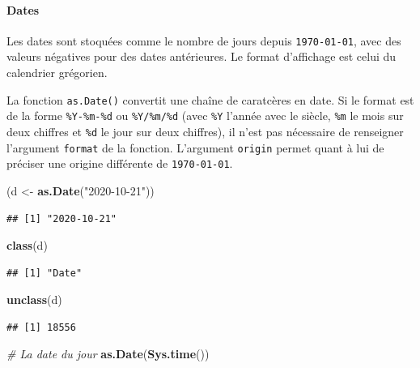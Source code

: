 \documentclass[
  11pt,
]{book}
\newenvironment{Shaded}{\begin{snugshade}}{\end{snugshade}}
\newcommand{\CommentTok}[1]{\textcolor[rgb]{0.56,0.35,0.01}{\textit{#1}}}
\newcommand{\KeywordTok}[1]{\textcolor[rgb]{0.13,0.29,0.53}{\textbf{#1}}}
\newcommand{\NormalTok}[1]{#1}
\newcommand{\StringTok}[1]{\textcolor[rgb]{0.31,0.60,0.02}{#1}}
\numberwithin{equation}{section}
\numberwithin{countremarque}{section}
\begin{document}
\hypertarget{dates}{%
\paragraph{Dates}\label{dates}}

Les dates sont stoquées comme le nombre de jours depuis \texttt{1970-01-01}, avec des valeurs négatives pour des dates antérieures. Le format d'affichage est celui du calendrier grégorien.

La fonction \texttt{as.Date()} convertit une chaîne de caratcères en date. Si le format est de la forme \texttt{\%Y-\%m-\%d} ou \texttt{\%Y/\%m/\%d} (avec \texttt{\%Y} l'année avec le siècle, \texttt{\%m} le mois sur deux chiffres et \texttt{\%d} le jour sur deux chiffres), il n'est pas nécessaire de renseigner l'argument \texttt{format} de la fonction. L'argument \texttt{origin} permet quant à lui de préciser une origine différente de \texttt{1970-01-01}.

\begin{Shaded}
\begin{Highlighting}[]
\NormalTok{(d \textless{}{-}}\StringTok{ }\KeywordTok{as.Date}\NormalTok{(}\StringTok{"2020{-}10{-}21"}\NormalTok{))}
\end{Highlighting}
\end{Shaded}

\begin{lstlisting}
## [1] "2020-10-21"
\end{lstlisting}

\begin{Shaded}
\begin{Highlighting}[]
\KeywordTok{class}\NormalTok{(d)}
\end{Highlighting}
\end{Shaded}

\begin{lstlisting}
## [1] "Date"
\end{lstlisting}

\begin{Shaded}
\begin{Highlighting}[]
\KeywordTok{unclass}\NormalTok{(d)}
\end{Highlighting}
\end{Shaded}

\begin{lstlisting}
## [1] 18556
\end{lstlisting}

\begin{Shaded}
\begin{Highlighting}[]
\CommentTok{\# La date du jour}
\KeywordTok{as.Date}\NormalTok{(}\KeywordTok{Sys.time}\NormalTok{())}
\end{Highlighting}
\end{Shaded}
\end{document}
